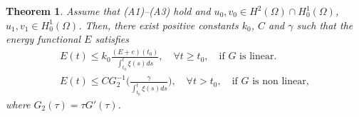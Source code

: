 \documentclass[11pt]{article}
\numberwithin{equation}{section}
\newtheorem{theorem}{Theorem}[section]
\begin{document}
\begin{theorem} \label{thm13}
Assume that {\rm (A1)--(A3)} hold and $u_0,v_0 \in H^2(\Omega) \cap H^1_0(\Omega)$,
$u_1,v_1 \in H^1_0(\Omega)$. Then, there exist positive constants $k_0$, $C$ and
$\gamma$ such that the energy functional $E$ satisfies
\begin{gather}
E(t) \leq k_0 \frac{\left( E + e \right)(t_0)}{\int_{t_0}^t\xi(s)ds},\quad
\forall t\geq t_0, \quad  \text{if $G$ is linear.} \label{e4.24}\\
E(t)\leq C G_2^{-1}\Big( \frac{\gamma}{\int_{t_0}^t \xi(s)ds}\Big), \quad
 \forall t>t_0, \quad \text{if $G$ is non linear}, \label{e4.25}
\end{gather}
where $ G_2(\tau ) = \tau G'(\tau )$.
\end{theorem}
\end{document}
